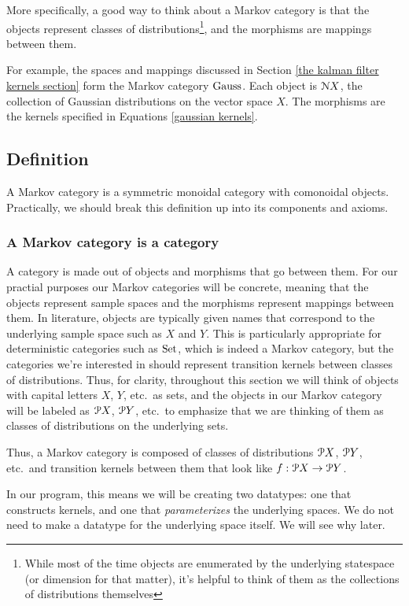 More specifically, a good way to think about a Markov category is that the objects represent classes of distributions\footnote{While most of the time objects are enumerated by the underlying statespace (or dimension for that matter), it's helpful to think of them as the collections of distributions themselves}, and the morphisms are mappings between them.

For example, the spaces and mappings discussed in Section \ref{the kalman filter kernels section} form the Markov category $\mathrm{Gauss}$.
Each object is $\mathcal{N} X$, the collection of Gaussian distributions on the vector space $X$.
The morphisms are the kernels specified in Equations \ref{gaussian kernels}.

\subsection{Definition}

A Markov category is a symmetric monoidal category with comonoidal objects.
Practically, we should break this definition up into its components and axioms.

\subsubsection{A Markov category is a category}

A category is made out of objects and morphisms that go between them.
For our practial purposes our Markov categories will be concrete, meaning that the objects represent sample spaces and the morphisms represent mappings between them.
In literature, objects are typically given names that correspond to the underlying sample space such as $X$ and $Y$.
This is particularly appropriate for deterministic categories such as $\mathrm{Set}$, which is indeed a Markov category, but the categories we're interested in should represent transition kernels between classes of distributions.
Thus, for clarity, throughout this section we will think of objects with capital letters $X$, $Y$, etc.\ as sets, and the objects in our Markov category will be labeled as $\mathcal{P} X$, $\mathcal{P} Y$, etc.\ to emphasize that we are thinking of them as classes of distributions on the underlying sets.

Thus, a Markov category is composed of classes of distributions $\mathcal{P} X$, $\mathcal{P} Y$, etc.\ and transition kernels between them that look like $f:\mathcal{P} X \rightarrow \mathcal{P} Y$.

In our program, this means we will be creating two datatypes: one that constructs kernels, and one that \emph{parameterizes} the underlying spaces.
We do not need to make a datatype for the underlying space itself.
We will see why later.

